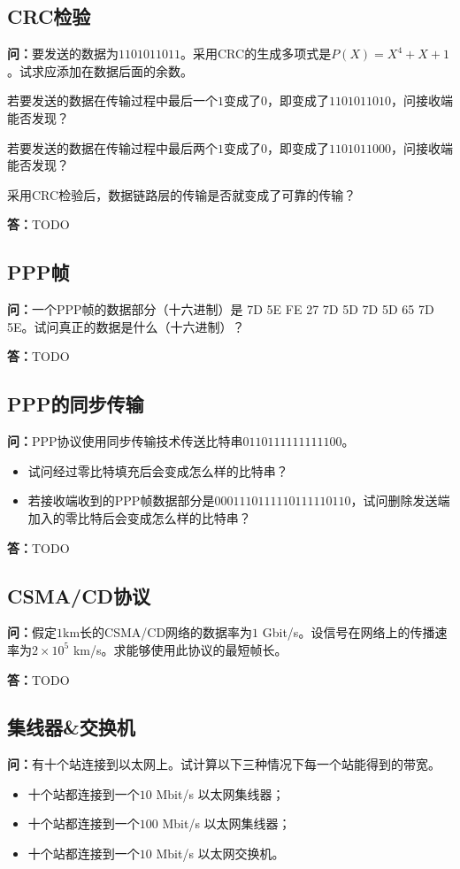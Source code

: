 \documentclass[12pt,hyperref,a4paper,UTF8]{ctexart}
\begin{document}
\subsection{CRC检验}
\textbf{问：}要发送的数据为$1101011011$。采用CRC的生成多项式是$P(X)=X^4+X+1$。试求应添加在数据后面的余数。

若要发送的数据在传输过程中最后一个$1$变成了$0$，即变成了$1101011010$，问接收端能否发现？

若要发送的数据在传输过程中最后两个$1$变成了$0$，即变成了$1101011000$，问接收端能否发现？

采用CRC检验后，数据链路层的传输是否就变成了可靠的传输？

\textbf{答：}TODO

\subsection{PPP帧}
\textbf{问：}一个PPP帧的数据部分（十六进制）是 7D 5E FE 27 7D 5D 7D 5D 65 7D 5E。试问真正的数据是什么（十六进制）？

\textbf{答：}TODO

\subsection{PPP的同步传输}
\textbf{问：}PPP协议使用同步传输技术传送比特串$0110111111111100$。
\begin{itemize}
    \item 试问经过零比特填充后会变成怎么样的比特串？
    \item 若接收端收到的PPP帧数据部分是$0001110111110111110110$，试问删除发送端加入的零比特后会变成怎么样的比特串？
\end{itemize}

\textbf{答：}TODO

\subsection{CSMA/CD协议}
\textbf{问：}假定$1$km长的CSMA/CD网络的数据率为$1$ Gbit/s。设信号在网络上的传播速率为$2\times10^5$ km/s。求能够使用此协议的最短帧长。

\textbf{答：}TODO

\subsection{集线器\&交换机}
\textbf{问：}有十个站连接到以太网上。试计算以下三种情况下每一个站能得到的带宽。
\begin{itemize}
    \item 十个站都连接到一个$10$ Mbit/s 以太网集线器；
    \item 十个站都连接到一个$100$ Mbit/s 以太网集线器；
    \item 十个站都连接到一个$10$ Mbit/s 以太网交换机。
\end{itemize}
\end{document}
